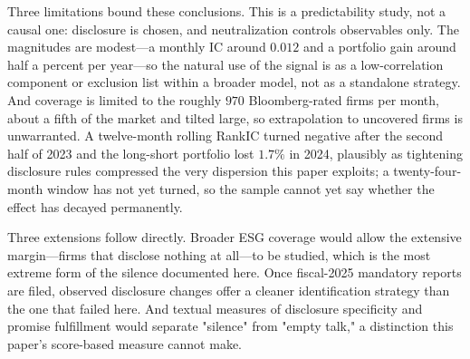 \documentclass[12pt]{article}
\begin{document}
Three limitations bound these conclusions. This is a predictability study, not
a causal one: disclosure is chosen, and neutralization controls observables
only. The magnitudes are modest---a monthly IC around $0.012$ and a portfolio
gain around half a percent per year---so the natural use of the signal is as a
low-correlation component or exclusion list within a broader model, not as a
standalone strategy. And coverage is limited to the roughly $970$ Bloomberg-rated
firms per month, about a fifth of the market and tilted large, so extrapolation
to uncovered firms is unwarranted. A twelve-month rolling RankIC turned
negative after the second half of 2023 and the long-short portfolio lost
$1.7\%$ in 2024, plausibly as tightening disclosure rules compressed the very
dispersion this paper exploits; a twenty-four-month window has not yet turned,
so the sample cannot yet say whether the effect has decayed permanently.

Three extensions follow directly. Broader ESG coverage would allow the
extensive margin---firms that disclose nothing at all---to be studied, which is
the most extreme form of the silence documented here. Once fiscal-2025
mandatory reports are filed, observed disclosure changes offer a cleaner
identification strategy than the one that failed here. And textual measures of
disclosure specificity and promise fulfillment would separate "silence" from
"empty talk," a distinction this paper's score-based measure cannot make.

\newpage


\end{document}
